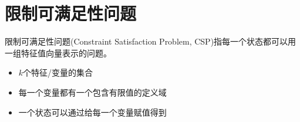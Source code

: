 
\section{限制可满足性问题}
限制可满足性问题(Constraint Satisfaction Problem, CSP)指每一个状态都可以用一组特征值向量表示的问题。
\begin{itemize}
	\item $k$个特征/变量的集合
	\item 每一个变量都有一个包含有限值的定义域
	\item 一个状态可以通过给每一个变量赋值得到
\end{itemize}